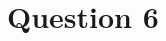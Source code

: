 \documentclass[../CSC_5RO12_TA_TP3.tex]{subfiles}
\begin{document}
\section{Question 6}
\end{document}
